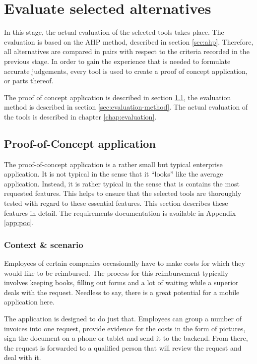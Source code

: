 \section{Evaluate selected alternatives}

In this stage, the actual evaluation of the selected tools takes place. The evaluation is based on the AHP method, described in section \ref{sec:ahp}. Therefore, all alternatives are compared in pairs with respect to the criteria recorded in the previous stage. In order to gain the experience that is needed to formulate accurate judgements, every tool is used to create a proof of concept application, or parts thereof.

The proof of concept application is described in section \ref{sec:poc}, the evaluation method is described in section \ref{sec:evaluation-method}. The actual evaluation of the tools is described in chapter \ref{chap:evaluation}.

\subsection{Proof-of-Concept application}
\label{sec:poc}

The proof-of-concept application is a rather small but typical enterprise application. It is not typical in the sense that it ``looks'' like the average application. Instead, it is rather typical in the sense that is contains the most requested features. This helps to ensure that the selected tools are thoroughly tested with regard to these essential features. This section describes these features in detail. The requirements documentation is available in Appendix \ref{app:poc}.

\subsubsection{Context \& scenario}

Employees of certain companies occasionally have to make costs for which they would like to be reimbursed. The process for this reimbursement typically involves keeping books, filling out forms and a lot of waiting while a superior deals with the request. Needless to say, there is a great potential for a mobile application here.

The application is designed to do just that. Employees can group a number of invoices into one request, provide evidence for the costs in the form of pictures, sign the document on a phone or tablet and send it to the backend. From there, the request is forwarded to a qualified person that will review the request and deal with it. 

